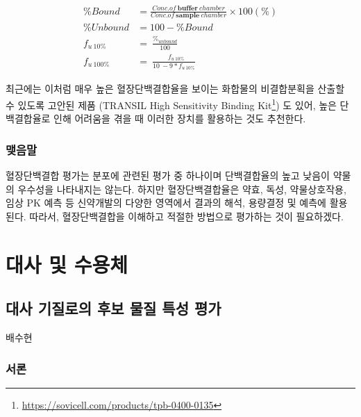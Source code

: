 \documentclass[
  11pt,
  krantz2, a4paper, twoside]{krantz}
\begin{document}
\begin{equation}
\begin{split}
\% Bound &= \frac{Conc.of\ \mathbf{buffer}\ chamber}{Conc.of\ \mathbf{sample}\ chamber} \times 100(\%) \\
\% Unbound &= 100 - \% Bound \\
f_{u\ 10\%} &= \ \frac{\%_{unbound}}{100} \\ 
f_{u\ 100\%} &= \ \frac{{\ \ \ f}_{u\ 10\%}}{10\  - 9*f_{u\ 10\%}}
\end{split}
\label{eq:eq03-03} 
\end{equation}

최근에는 이처럼 매우 높은 혈장단백결합율을 보이는 화합물의 비결합분획을 산출할 수 있도록 고안된 제품 (TRANSIL High Sensitivity Binding Kit\footnote{\url{https://sovicell.com/products/tpb-0400-0135}}) 도 있어, 높은 단백결합율로 인해 어려움을 겪을 때 이러한 장치를 활용하는 것도 추천한다.

\hypertarget{uxb9fauxc74cuxb9d0-2}{%
\section{맺음말}\label{uxb9fauxc74cuxb9d0-2}}

혈장단백결합 평가는 분포에 관련된 평가 중 하나이며 단백결합율의 높고 낮음이 약물의 우수성을 나타내지는 않는다. 하지만 혈장단백결합율은 약효, 독성, 약물상호작용, 임상 PK 예측 등 신약개발의 다양한 영역에서 결과의 해석, 용량결정 및 예측에 활용된다. 따라서, 혈장단백결합을 이해하고 적절한 방법으로 평가하는 것이 필요하겠다.

\hypertarget{part-uxb300uxc0ac-uxbc0f-uxc218uxc6a9uxccb4}{%
\part{대사 및 수용체}\label{part-uxb300uxc0ac-uxbc0f-uxc218uxc6a9uxccb4}}

\hypertarget{uxb300uxc0ac-uxae30uxc9c8uxb85cuxc758-uxd6c4uxbcf4-uxbb3cuxc9c8-uxd2b9uxc131-uxd3c9uxac00}{%
\chapter{대사 기질로의 후보 물질 특성 평가}\label{uxb300uxc0ac-uxae30uxc9c8uxb85cuxc758-uxd6c4uxbcf4-uxbb3cuxc9c8-uxd2b9uxc131-uxd3c9uxac00}}

\Large\hfill

배수현
\normalsize

\hypertarget{uxc11cuxb860-3}{%
\section{서론}\label{uxc11cuxb860-3}}
\end{document}
